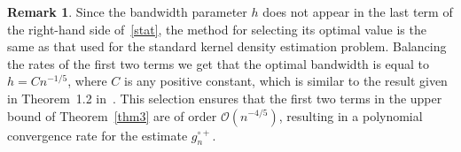 \documentclass[a4paper,11pt]{article}
\theoremstyle{definition}
\newtheorem{remark}{Remark}
\newcommand{\R}{{\mathbb{R}}}
\newcommand{\1}{\mathbb{I}}
\newcommand{\A}{\mathscr{A}}
\renewcommand{\A}{\mathcal{A}}
\def\R{\mathbb{R}}
\newcommand{\F}{\mathcal{F}}
\newtheorem{thm}{Theorem}
\theoremstyle{remark}
\begin{document}
\begin{remark}\label{rem6}
Since the bandwidth parameter $h$ does not appear in the last term of the right-hand side of~\eqref{stat}, the method for selecting its optimal value is the same as that used for the standard kernel density estimation problem. Balancing the rates of the first two terms we get that the optimal bandwidth is equal to  $h = C n^{-1/5}$, where \(C\) is any positive constant, which is similar to the result given in Theorem~1.2 in~\cite{Tsybakov}. This selection ensures that the first two terms in the upper bound of Theorem~\ref{thm3} are of order $\mathcal{O}(n^{-4/5})$, resulting in a polynomial convergence rate for the estimate $g^{\circ+}_{n}$.
\end{remark}
%
\end{document}

